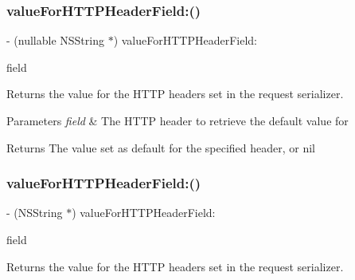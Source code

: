 \subsubsection{\texorpdfstring{value\+For\+H\+T\+T\+P\+Header\+Field\+:()}{valueForHTTPHeaderField:()}\hspace{0.1cm}{\footnotesize\ttfamily [1/3]}}
{\footnotesize\ttfamily -\/ (nullable N\+S\+String $\ast$) value\+For\+H\+T\+T\+P\+Header\+Field\+: \begin{DoxyParamCaption}\item[{(N\+S\+String $\ast$)}]{field }\end{DoxyParamCaption}}

Returns the value for the H\+T\+TP headers set in the request serializer.


\begin{DoxyParams}{Parameters}
{\em field} & The H\+T\+TP header to retrieve the default value for\\
\hline
\end{DoxyParams}
\begin{DoxyReturn}{Returns}
The value set as default for the specified header, or {\ttfamily nil} 
\end{DoxyReturn}
\mbox{\label{interface_a_f_h_t_t_p_request_serializer_ad3772ba3e52f7d71a2a08f2b3c113721}} 
\subsubsection{\texorpdfstring{value\+For\+H\+T\+T\+P\+Header\+Field\+:()}{valueForHTTPHeaderField:()}\hspace{0.1cm}{\footnotesize\ttfamily [2/3]}}
{\footnotesize\ttfamily -\/ (N\+S\+String $\ast$) value\+For\+H\+T\+T\+P\+Header\+Field\+: \begin{DoxyParamCaption}\item[{(N\+S\+String $\ast$)}]{field }\end{DoxyParamCaption}}

Returns the value for the H\+T\+TP headers set in the request serializer.


